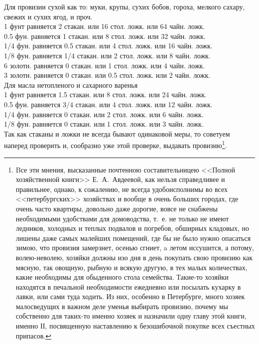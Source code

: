 Для провизии сухой как то: муки, крупы, сухих бобов, гороха, мелкого сахару, свежих и сухих ягод, и проч.\\
1 фунт равняется 2 стакан. или 16 стол. ложк. или 64 чайн. ложк.\\
0.5 фун. равняется 1 стакан. или 8 стол. ложк. или 32 чайн. ложк.\\
1/4 фун. равняется 0.5 стакан. или 4 стол. ложк. или 16 чайн. ложк.\\
1/8 фун. равняется 1/4 стакан. или 2 стол. ложк. или 8 чайн. ложк.\\
6 золотн. равняется 0 стакан. или 1 стол. ложк. или 4 чайн. ложк.\\
3 золотн. равняется 0 стакан. или 0.5 стол. ложк. или 2 чайн. ложк.\\

Для масла нетопленого и сахарного варенья\\
1 фунт равняется 1.5 стакан. или 8 стол. ложк. или 24 чайн. ложк.\\
0.5 фун. равняется 3/4 стакан. или 4 стол. ложк. или 12 чайн. ложк.\\
1/4 фун. равняется 0 стакан. или 2 стол. ложк. или 6 чайн. ложк.\\
1/8 фун. равняется 0 стакан. или 1 стол. ложк. или 3 чайн. ложк.\\

Так как стаканы и ложки не всегда бывают одинаковой меры, то советуем наперед проверить и, сообразно уже этой проверке, выдавать провизию\footnote{Bсе эти мнения, высказанные почтенною составительницею <<Полной хозяйственной книги>> Е.~А.~Авдеевой, как нельзя справедливее и правильнее, однако, к сожалению, не всегда удобоисполнимы во всех <<петербургских>> хозяйствах и вообще в очень больших городах, где очень часто квартиры, довольно даже дорогие, вовсе не снабжены необходимыми удобствами для домоводства, т.~е. не только не имеют ледников, холодных и теплых подвалов и погребов, обширных кладовых, но лишены даже самых малейших помещений, где бы не было нужно опасаться зимою, что провизия замерзнет, осенью сгниет, a летом иссушится, а потому, волею-неволею, хозяйки должны изо дня в день покупать свою провизию как мясную, так овощную, рыбную и всякую другую, в тех малых количествах, какие необходимы для обыденного стола семейства. Такие-то хозяйки находятся в печальной необходимости ежедневно или посылать кухарку в лавки, или сами туда ходить. Из них, особенно в Петербурге, много хозяек малосведущих в важном деле уменья выбирать провизию, почему мы собственно для таких-то именно хозяек и назначили одну главу этой книги, именно ІІ, посвященную наставлению к безошибочной покупке всех съестных припасов.}.

